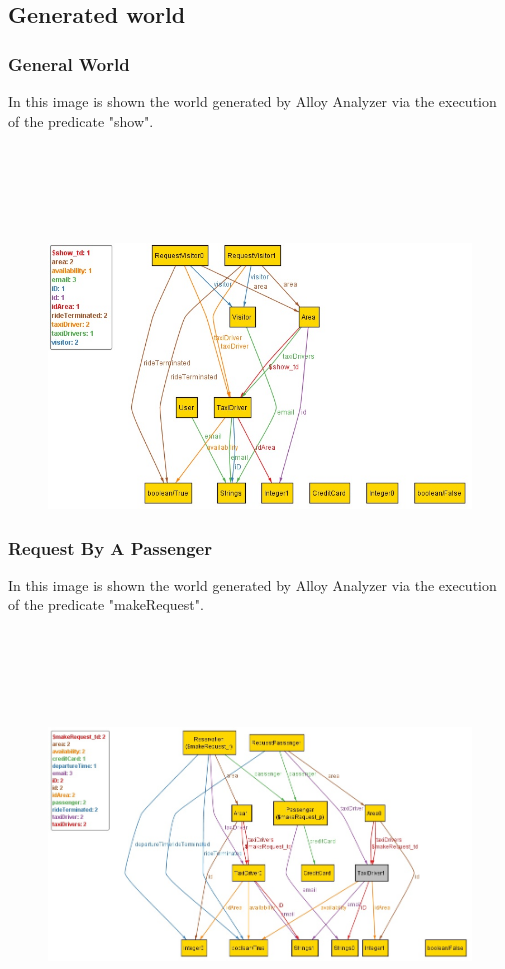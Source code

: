 \documentclass[18pt,oneside,a4paper, titlepage]{article}
\begin{document}
	\subsection{Generated world}
		\subsubsection{General World}
		In this image is shown the world generated by Alloy Analyzer via the
		execution of the predicate "show".
		\\ \\ \\ \\ \\ \\
			\begin{figure}[h]
				\includegraphics[scale=0.7]{show.jpg}
			\end{figure}
\newpage
		\subsubsection{Request By A Passenger}
		In this image is shown the world generated by Alloy Analyzer via the
		execution of the predicate "makeRequest".
		\\ \\ \\ \\ \\ \\
		\begin{figure}[h]
			\includegraphics[scale=0.6]{makeRequest.jpg}
		\end{figure}
\newpage
\end{document}
